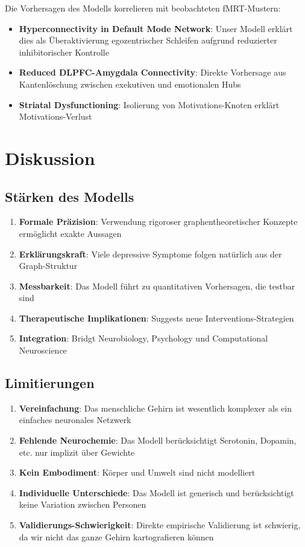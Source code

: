 \documentclass[a4paper,12pt]{article}
\theoremstyle{definition}
\begin{document}
Die Vorhersagen des Modells korrelieren mit beobachteten fMRT-Mustern:

\begin{itemize}
	\item \textbf{Hyperconnectivity in Default Mode Network}: Unser Modell erklärt dies als Überaktivierung egozentrischer Schleifen aufgrund reduzierter inhibitorischer Kontrolle
	\item \textbf{Reduced DLPFC-Amygdala Connectivity}: Direkte Vorhersage aus Kantenlöschung zwischen exekutiven und emotionalen Hubs
	\item \textbf{Striatal Dysfunctioning}: Isolierung von Motivations-Knoten erklärt Motivations-Verlust
\end{itemize}

\section{Diskussion}

\subsection{Stärken des Modells}

\begin{enumerate}
	\item \textbf{Formale Präzision}: Verwendung rigoroser graphentheoretischer Konzepte ermöglicht exakte Aussagen
	\item \textbf{Erklärungskraft}: Viele depressive Symptome folgen natürlich aus der Graph-Struktur
	\item \textbf{Messbarkeit}: Das Modell führt zu quantitativen Vorhersagen, die testbar sind
	\item \textbf{Therapeutische Implikationen}: Suggests neue Interventions-Strategien
	\item \textbf{Integration}: Bridgt Neurobiology, Psychology und Computational Neuroscience
\end{enumerate}

\subsection{Limitierungen}

\begin{enumerate}
	\item \textbf{Vereinfachung}: Das menschliche Gehirn ist wesentlich komplexer als ein einfaches neuronales Netzwerk
	\item \textbf{Fehlende Neurochemie}: Das Modell berücksichtigt Serotonin, Dopamin, etc. nur implizit über Gewichte
	\item \textbf{Kein Embodiment}: Körper und Umwelt sind nicht modelliert
	\item \textbf{Individuelle Unterschiede}: Das Modell ist generisch und berücksichtigt keine Variation zwischen Personen
	\item \textbf{Validierungs-Schwierigkeit}: Direkte empirische Validierung ist schwierig, da wir nicht das ganze Gehirn kartografieren können
\end{enumerate}
\end{document}
